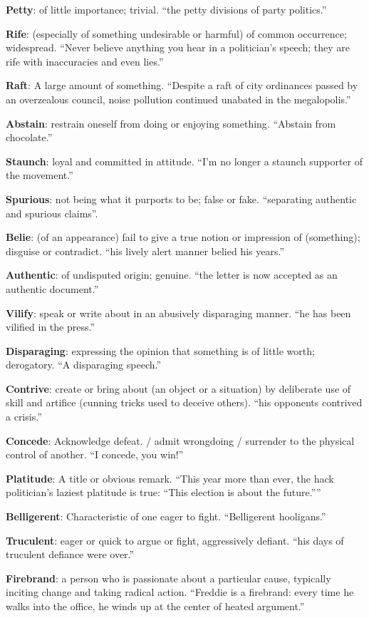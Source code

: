 \documentclass[12pt, a4paper]{ximera}
\begin{document}
\textbf{Petty}: of little importance; trivial. ``the petty divisions of party politics.''

\textbf{Rife}: (especially of something undesirable or harmful) of common occurrence; widespread. ``Never believe anything you hear in a politician's speech; they are rife with inaccuracies and even lies.''

\textbf{Raft}: A large amount of something. ``Despite a raft of city ordinances passed by an overzealous council, noise pollution continued unabated in the megalopolis.''

\textbf{Abstain}: restrain oneself from doing or enjoying something. ``Abstain from chocolate.''

\textbf{Staunch}: loyal and committed in attitude. ``I'm no longer a staunch supporter of the movement.''

\textbf{Spurious}: not being what it purports to be; false or fake. ``separating authentic and spurious claims''.

\textbf{Belie}: (of an appearance) fail to give a true notion or impression of (something); disguise or contradict. ``his lively alert manner belied his years.''

\textbf{Authentic}: of undisputed origin; genuine. ``the letter is now accepted as an authentic document.''

\textbf{Vilify}: speak or write about in an abusively disparaging manner. ``he has been vilified in the press.''

\textbf{Disparaging}: expressing the opinion that something is of little worth; derogatory. ``A disparaging speech.''

\textbf{Contrive}: create or bring about (an object or a situation) by deliberate use of skill and artifice (cunning tricks used to deceive others). ``his opponents contrived a crisis.''

\textbf{Concede}: Acknowledge defeat. / admit wrongdoing / surrender to the physical control of another. ``I concede, you win!''

\textbf{Platitude}: A title or obvious remark. ``This year more than ever, the hack politician's laziest platitude is true: ``This election is about the future.''''

\textbf{Belligerent}: Characteristic of one eager to fight. ``Belligerent hooligans.''

\textbf{Truculent}: eager or quick to argue or fight, aggressively defiant. ``his days of truculent defiance were over.''

\textbf{Firebrand}: a person who is passionate about a particular cause, typically inciting change and taking radical action. ``Freddie is a firebrand: every time he walks into the office, he winds up at the center of heated argument.''
\end{document}
